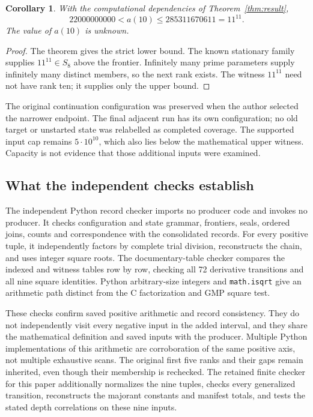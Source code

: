 \documentclass[11pt]{article}
\newtheorem{corollary}[theorem]{Corollary}
\theoremstyle{definition}
\theoremstyle{remark}
\begin{document}
\begin{corollary}\label{cor:next}
With the computational dependencies of Theorem~\ref{thm:result},
\begin{equation}\label{eq:next}
 22000000000<a(10)\le285311670611=11^{11}.
\end{equation}
The value of $a(10)$ is unknown.
\end{corollary}
\begin{proof}
The theorem gives the strict lower bound. The known stationary
family supplies $11^{11}\in S_8$ above the frontier. Infinitely
many prime parameters supply infinitely many distinct members,
so the next rank exists. The witness $11^{11}$ need not have rank
ten; it supplies only the upper bound.
\end{proof}

The original continuation configuration was preserved when the
author selected the narrower endpoint. The final adjacent run has
its own configuration; no old target or unstarted state was
relabelled as completed coverage. The supported input cap remains
$5\cdot10^{10}$, which also lies below the mathematical upper
witness. Capacity is not evidence that those additional inputs
were examined.

\subsection{What the independent checks establish}\label{sec:checks}

The independent Python record checker imports no producer code and
invokes no producer. It checks configuration and state grammar,
frontiers, seals, ordered joins, counts and correspondence with the
consolidated records. For every positive tuple, it independently
factors by complete trial division, reconstructs the chain, and
uses integer square roots. The documentary-table checker compares
the indexed and witness tables row by row, checking all 72
derivative transitions and all nine square identities.
Python arbitrary-size integers and \texttt{math.isqrt}
\cite{python} give an arithmetic path distinct from the C
factorization and GMP square test.

These checks confirm saved positive arithmetic and record
consistency. They do not independently visit every negative input
in the added interval, and they share the mathematical definition
and saved inputs with the producer. Multiple Python implementations
of this arithmetic are corroboration of the same positive axis,
not multiple exhaustive scans. The original first five ranks and
their gaps remain inherited, even though their membership is
rechecked. The retained finite checker for this paper additionally
normalizes the nine tuples, checks every generalized transition,
reconstructs the majorant constants and manifest totals, and tests
the stated depth correlations on these nine inputs.
\end{document}
